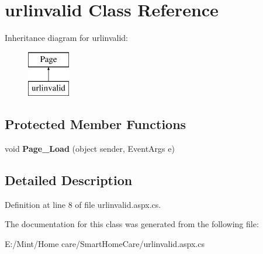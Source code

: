 \hypertarget{classurlinvalid}{\section{urlinvalid Class Reference}
\label{classurlinvalid}
}
Inheritance diagram for urlinvalid\-:\begin{figure}[H]
\begin{center}
\leavevmode
\includegraphics[height=2.000000cm]{classurlinvalid}
\end{center}
\end{figure}
\subsection*{Protected Member Functions}
\begin{DoxyCompactItemize}
\item 
\hypertarget{classurlinvalid_a86a82bd93ece5fdd33c184ba00155264}{void {\bfseries Page\-\_\-\-Load} (object sender, Event\-Args e)}\label{classurlinvalid_a86a82bd93ece5fdd33c184ba00155264}

\end{DoxyCompactItemize}


\subsection{Detailed Description}


Definition at line 8 of file urlinvalid.\-aspx.\-cs.



The documentation for this class was generated from the following file\-:\begin{DoxyCompactItemize}
\item 
E\-:/\-Mint/\-Home care/\-Smart\-Home\-Care/urlinvalid.\-aspx.\-cs\end{DoxyCompactItemize}
